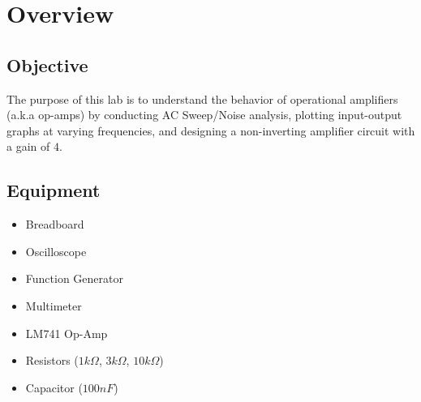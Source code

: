 \chapter{Overview}

\section{Objective}
The purpose of this lab is to understand the behavior of operational amplifiers (a.k.a op-amps) by conducting AC Sweep/Noise analysis, plotting input-output graphs at varying frequencies, and designing a non-inverting amplifier circuit with a gain of $4$. 

\section{Equipment}
\begin{itemize}
    \item Breadboard
    \item Oscilloscope
    \item Function Generator
    \item Multimeter
    \item LM741 Op-Amp
    \item Resistors ($1k\Omega$, $3k\Omega$, $10k\Omega$)
    \item Capacitor ($100nF$)
\end{itemize}
